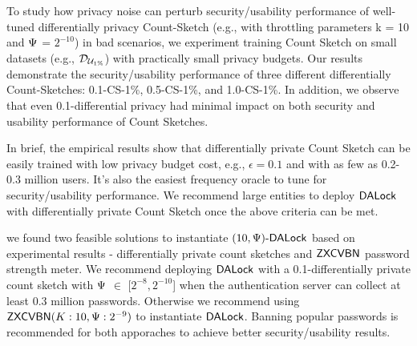To study how privacy noise can perturb security/usability performance of well-tuned differentially privacy Count-Sketch (e.g., with throttling parameters k = 10 and $\Psi$ = $2^{-10}$) in bad scenarios, we experiment training Count Sketch on small datasets (e.g., $\mathcal{D}_{{\mathcal{U}_{1\%}}}$) with practically small privacy budgets. Our results demonstrate the security/usability performance of three different differentially Count-Sketches: 0.1-CS-1\%, 0.5-CS-1\%, and 1.0-CS-1\%. In addition, we observe that even 0.1-differential privacy had minimal impact on both security and usability performance of Count Sketches. 

In brief, the empirical results show that differentially private Count Sketch can be easily trained with low privacy budget cost, e.g., $\epsilon = 0.1$ and with as few as 0.2-0.3 million users. It's also the easiest frequency oracle to tune for security/usability performance. We recommend large entities to deploy $\mathsf{DALock}$ with differentially private Count Sketch once the above criteria can be met.

 we found two feasible solutions to instantiate $(10, \Psi)\text{-}\mathsf{DALock}$ based on experimental results - differentially private count sketches and $\mathsf{ZXCVBN}$ password strength meter. We recommend deploying $\mathsf{DALock}$ with a 0.1-differentially private count sketch with $\Psi$ $\in$ [$2^{-8},2^{-10}$] when the authentication server can collect at least 0.3 million passwords. Otherwise we recommend using $\mathsf{ZXCVBN}(K:10,\Psi:2^{-9})$ to instantiate $\mathsf{DALock}$. Banning popular passwords is recommended for both apporaches to achieve better security/usability results. 



